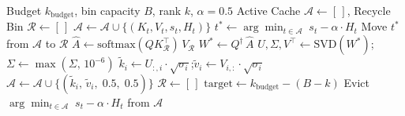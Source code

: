 \documentclass[11pt,a4paper]{article}
\begin{document}
\begin{algorithm}[H]
\caption{HAE SRC Compression Cycle (\texttt{HAECacheManager})}
\begin{algorithmic}[1]
\Require Budget $k_{\text{budget}}$, bin capacity $B$, rank $k$, $\alpha = 0.5$
\Require Active Cache $\mathcal{A} \leftarrow [\,]$, Recycle Bin $\mathcal{R} \leftarrow [\,]$
\vspace{0.3em}
 
    \State $\mathcal{A} \leftarrow \mathcal{A} \cup \{(K_t, V_t, s_t, H_t)\}$
        \State $t^* \leftarrow \arg\min_{t \in \mathcal{A}}\; s_t - \alpha \cdot H_t$ 
        \State Move $t^*$ from $\mathcal{A}$ to $\mathcal{R}$
    \EndIf
        \State {}
    \EndIf
\EndProcedure
\vspace{0.3em}
    \State $\hat{A} \leftarrow \text{softmax}(Q K_{\mathcal{R}}^\top)\, V_{\mathcal{R}}$ 
    \State $W^* \leftarrow Q^{\dagger}\, \hat{A}$ 
    \State $U, \Sigma, V^\top \leftarrow \text{SVD}(W^*)$;\quad $\Sigma \leftarrow \max(\Sigma,\, 10^{-6})$
        \State $\tilde{k}_i \leftarrow U_{:,i} \cdot \sqrt{\sigma_i}$;\quad $\tilde{v}_i \leftarrow V_{i,:} \cdot \sqrt{\sigma_i}$
        \State $\mathcal{A} \leftarrow \mathcal{A} \cup \{(\tilde{k}_i,\, \tilde{v}_i,\; 0.5,\; 0.5)\}$ 
    \EndFor
    \State $\mathcal{R} \leftarrow [\,]$
    \State $\text{target} \leftarrow k_{\text{budget}} - (B - k)$ 
        \State Evict $\arg\min_{t \in \mathcal{A}}\; s_t - \alpha \cdot H_t$ from $\mathcal{A}$
    \EndWhile
\EndProcedure
\end{algorithmic}
\end{algorithm}
\end{document}
